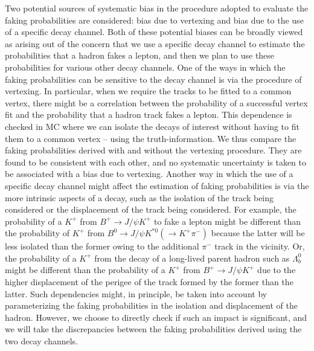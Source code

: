 Two potential sources of systematic bias in the procedure adopted to evaluate the faking probabilities are considered: bias due to vertexing and bias due to the use of a specific decay channel. %
Both of these potential biases can be broadly viewed as arising out of the concern that we use a specific decay channel to estimate the probabilities that a hadron fakes a lepton, and then we plan to use these probabilities for various other decay channels. %
One of the ways in which the faking probabilities can be sensitive to the decay channel is via the procedure of vertexing. %
In particular, when we require the tracks to be fitted to a common vertex, there might be a correlation between the probability of a successful vertex fit and the probability that a hadron track fakes a lepton. %
This dependence is checked in MC where we can isolate the decays of interest without having to fit them to a common vertex -- using the truth-information. %
We thus compare the faking probabilities derived with and without the vertexing procedure. %
They are found to be consistent with each other, and no systematic uncertainty is taken to be associated with a bias due to vertexing. %
Another way in which the use of a specific decay channel might affect the estimation of faking probabilities is via the more intrinsic aspects of a decay, such as the isolation of the track being considered or the displacement of the track being considered. %
For example, the probability of a $K^+$ from $B^+\to J/\psi K^+$ to fake a lepton might be different than the probability of $K^+$ from  $B^0\to J/\psi K^{\ast 0}(\to K^+\pi^-)$ because the latter will be less isolated than the former owing to the additional $\pi^-$ track in the vicinity. %
Or, the probability of a $K^+$ from the decay of a long-lived parent hadron such as $\Lambda_b^0$ might be different than the probability of a $K^+$ from $B^+\to J/\psi K^+$ due to the higher displacement of the perigee of the track formed by the former than the latter. %
Such dependencies might, in principle, be taken into account by parameterizing the faking probabilities in the isolation and displacement of the hadron. %
However, we choose to directly check if such an impact is significant, and we will take the discrepancies between the faking probabilities derived using the two decay channels. %
